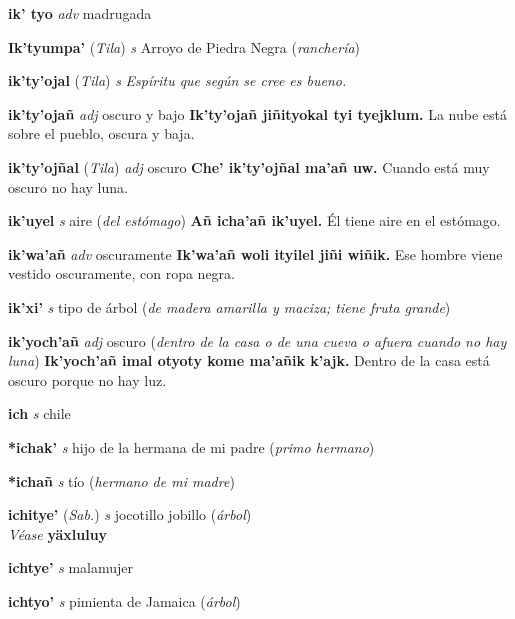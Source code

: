\documentclass[10pt]{scrbook}
\newcommand{\entry}[1]{\textbf{#1}}
\newcommand{\nontranslationdef}[1]{\textit{#1}}
\newcommand{\partofspeech}[1]{\textit{#1}}
\newcommand{\spanishtranslation}[1]{#1}
\newcommand{\clarification}[1]{(\textit{#1})}
\newcommand{\cholexample}[1]{\textbf{#1}}
\newcommand{\exampletranslation}[1]{#1}
\newcommand{\alsosee}[1]{\\\textit{Véase} \textbf{#1}}
\newcommand{\relevantdialect}[1]{(\textit{#1})}
\begin{document}
\begin{multicols}{2}
\entry{ik' tyo}
\partofspeech{adv}
\spanishtranslation{madrugada}

\entry{Ik'tyumpa'}
\relevantdialect{Tila}
\partofspeech{s}
\spanishtranslation{Arroyo de Piedra Negra}
\clarification{ranchería}

\entry{ik'ty'ojal}
\relevantdialect{Tila}
\partofspeech{s}
\nontranslationdef{Espíritu que según se cree es bueno.}

\entry{ik'ty'ojañ}
\partofspeech{adj}
\spanishtranslation{oscuro y bajo}
\cholexample{Ik'ty'ojañ jiñityokal tyi tyejklum.}
\exampletranslation{La nube está sobre el pueblo, oscura y baja.}

\entry{ik'ty'ojñal}
\relevantdialect{Tila}
\partofspeech{adj}
\spanishtranslation{oscuro}
\cholexample{Che' ik'ty'ojñal ma'añ uw.}
\exampletranslation{Cuando está muy oscuro no hay luna.}

\entry{ik'uyel}
\partofspeech{s}
\spanishtranslation{aire}
\clarification{del estómago}
\cholexample{Añ icha'añ ik'uyel.}
\exampletranslation{Él tiene aire en el estómago.}

\entry{ik'wa'añ}
\partofspeech{adv}
\spanishtranslation{oscuramente}
\cholexample{Ik'wa'añ woli ityilel jiñi wiñik.}
\exampletranslation{Ese hombre viene vestido oscuramente, con ropa negra.}

\entry{ik'xi'}
\partofspeech{s}
\spanishtranslation{tipo de árbol}
\clarification{de madera amarilla y maciza; tiene fruta grande}

\entry{ik'yoch'añ}
\partofspeech{adj}
\spanishtranslation{oscuro}
\clarification{dentro de la casa o de una cueva o afuera cuando no hay luna}
\cholexample{Ik'yoch'añ imal otyoty kome ma'añik k'ajk.}
\exampletranslation{Dentro de la casa está oscuro porque no hay luz.}

\entry{ich}
\partofspeech{s}
\spanishtranslation{chile}

\entry{*ichak'}
\partofspeech{s}
\spanishtranslation{hijo de la hermana de mi padre}
\clarification{primo hermano}

\entry{*ichañ}
\partofspeech{s}
\spanishtranslation{tío}
\clarification{hermano de mi madre}

\entry{ichitye'}
\relevantdialect{Sab.}
\partofspeech{s}
\spanishtranslation{jocotillo}
\spanishtranslation{jobillo}
\clarification{árbol}
\alsosee{yäxluluy}

\entry{ichtye'}
\partofspeech{s}
\spanishtranslation{malamujer}

\entry{ichtyo'}
\partofspeech{s}
\spanishtranslation{pimienta de Jamaica}
\clarification{árbol}


\end{multicols}
\end{document}
